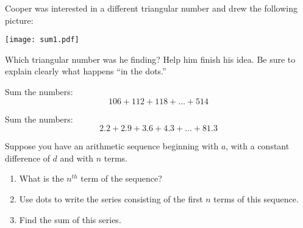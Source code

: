\documentclass[nooutcomes]{ximera}
\begin{document}
\begin{problem}
Cooper was interested in a different triangular number and drew the following picture:   
\begin{image}
\texttt{[image: sum1.pdf]}
\end{image}
Which triangular number was he finding?  Help him finish his idea.  Be sure to explain clearly what 
happens ``in the dots.'' 
\end{problem}


\begin{problem}
Sum the numbers:  
\[
106 + 112 + 118 + \dots + 514
\]
\end{problem}

\begin{problem}
Sum the numbers:
\[
2.2 + 2.9 + 3.6 + 4.3 + \dots + 81.3
\]
\end{problem}


\begin{problem}
Suppose you have an arithmetic sequence beginning with $a$, with a constant difference of $d$ and with $n$ terms.  
\begin{enumerate}
\item What is the $n^{th}$ term of the sequence?  
\item Use dots to write the series consisting of the first $n$ terms of this sequence.
\item Find the sum of this series.  
\end{enumerate}
\end{problem}
\end{document}
